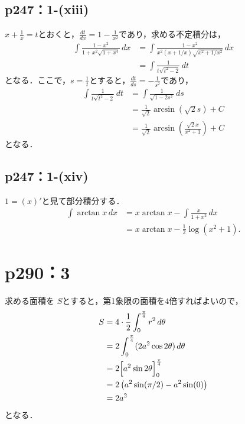 \documentclass[a4paper,10pt,fleqn]{ltjsarticle}
\begin{document}
\subsection*{p247：1-(xiii)}


\begin{tleftbar}
    $x+\frac{1}{x}=t$とおくと，$\frac{dt}{dx}=1-\frac{1}{x^2}$であり，求める不定積分は，
    \begin{align*} 
        \int \frac{1-x^2}{1+x^2\sqrt{1+x^4}} \, dx & = \int \frac{1-x^2}{x^2 (x+1/x)\sqrt{x^2 + 1/x^2}} \, dx \\
        & =\int \frac{1}{t\sqrt{t^2-2}} \, dt
    \end{align*}
    となる．ここで，$s=\frac{1}{t}$とすると，$\frac{dt}{ds}=-\frac{1}{s^2}$であり，
    \begin{align*} 
        \int \frac{1}{t \sqrt{t^2-2}} \, dt & = \int \frac{1}{\sqrt{1-2s^2}} \, ds \\
        & = \frac{1}{\sqrt{2}} \arcsin (\sqrt{2}s)+C \\
        & = \frac{1}{\sqrt{2}} \arcsin \left(\frac{\sqrt{2}x}{x^2+1} \right)+C
    \end{align*}
    となる．
\end{tleftbar}

\subsection*{p247：1-(xiv)}


\begin{leftbar}
    $1 = (x)'$と見て部分積分する．
    \begin{align*}
      \int \arctan x \,dx
      &= x \arctan x - \int \frac{x}{1+x^2} \,dx \\
      &= x \arctan x - \frac{1}{2} \log (x^2+1).
    \end{align*}
  \end{leftbar}

\newpage 


\section*{p290：3}

\begin{leftbar}
    求める面積を $S$とすると，第1象限の面積を$4$倍すればよいので，
    \begin{align*} 
        S & =4 \cdot  \frac{1}{2}\int_{0}^{\frac{\pi}{4}} r^2 \, d \theta \\
        & = 2 \int_{0}^{\frac{\pi}{4}} (2a^2 \cos 2\theta) \, d \theta \\
        & =2\Bigl [ a^2 \sin 2\theta \Bigl ]_{0}^{\frac{\pi}{4}} \\
        & = 2\left ( a^2 \sin (\pi/2)-a^2 \sin (0) \right) \\
        & = 2a^2
    \end{align*} 
    となる．
\end{leftbar}
\end{document}
